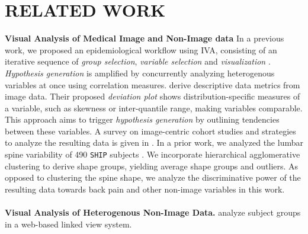 \documentclass[a4paper,twoside]{style/article}
\begin{document}
\section{\uppercase{Related Work}}
\label{sec:RelatedWork}
\noindent \textbf{Visual Analysis of Medical Image and Non-Image data}
In a previous work, we proposed an epidemiological workflow using IVA, consisting of an iterative sequence of \emph{group selection}, \emph{variable selection} and \emph{visualization} \cite{Klemm2014VIS}.
\emph{Hypothesis generation} is amplified by concurrently analyzing heterogenous variables at once using correlation measures.
\cite{Turkay} derive descriptive data metrics from image data.
Their proposed \emph{deviation plot} shows distribution-specific measures of a variable, such as skewness or inter-quantile range, making variables comparable.
This approach aims to trigger \emph{hypothesis generation} by outlining tendencies between these variables.
A survey on image-centric cohort studies and strategies to analyze the resulting data is given in \cite{Preim2015}.
In a prior work, we analyzed the lumbar spine variability of 490 \texttt{SHIP} subjects \cite{Klemm2013VMV}.
We incorporate hierarchical agglomerative clustering to derive shape groups, yielding average shape groups and outliers.
As opposed to clustering the spine shape, we analyze the discriminative power of the resulting data towards back pain and other non-image variables in this work.
\\\\
\noindent \textbf{Visual Analysis of Heterogenous Non-Image Data.}
\cite{Zhang} analyze subject groups in a web-based linked view system.
\end{document}
